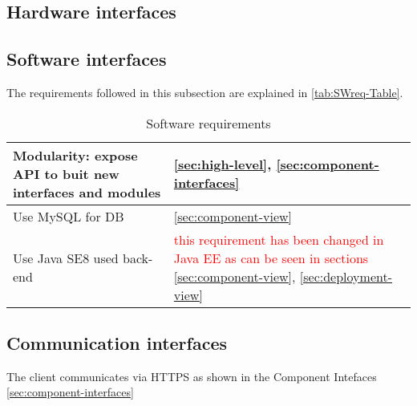 \subsection{Hardware interfaces}

\subsection{Software interfaces}

The requirements followed in this subsection are explained in \autoref{tab:SWreq-Table}.

\begin{table}[h]
\begin{center}
\begin{tabular}{|p{}|p{}|}
\hline
Modularity: expose API to buit new interfaces and modules & \ref{sec:high-level}, \ref{sec:component-interfaces}\\
\hline
Use MySQL for DB  & \ref{sec:component-view}\\
\hline
Use Java SE8 used back-end & \textcolor{red}{this requirement has been changed in Java EE as can be seen in sections} \ref{sec:component-view}, \ref{sec:deployment-view}\\
\hline
\end{tabular}
\caption{Software requirements}
\label{tab:SWreq-Table}
\end{center}
\end{table}


\subsection{Communication interfaces}
The client communicates via HTTPS as shown in the Component Intefaces \autoref{sec:component-interfaces}








